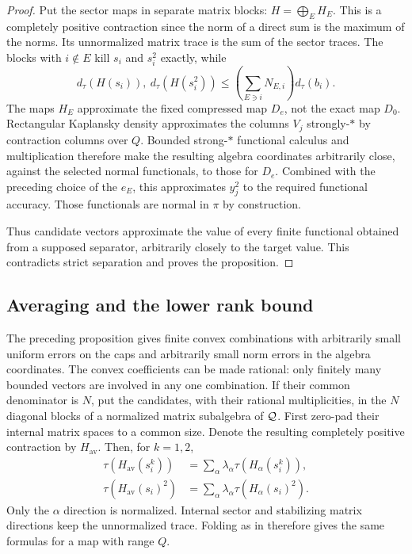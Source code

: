 \begin{proof}
Put the sector maps in separate matrix blocks:
$H=\bigoplus_E H_E$.  This is a completely positive contraction since
the norm of a direct sum is the maximum of the norms.  Its
unnormalized matrix trace is the sum of the sector traces.  The blocks
with $i\notin E$ kill $s_i$ and $s_i^2$ exactly, while
\[
 d_\tau(H(s_i)),\ d_\tau(H(s_i^2))
   \leq\left(\sum_{E\ni i}N_{E,i}\right)d_\tau(b_i).
\]
The maps $H_E$ approximate the fixed compressed map $D_e$,
not the exact map $D_0$.  Rectangular Kaplansky density approximates the
columns $V_j$ strongly-$*$ by contraction columns over $Q$.  Bounded
strong-$*$ functional calculus and multiplication therefore make the
resulting algebra coordinates arbitrarily close, against the selected
normal functionals, to those for $D_e$.  Combined with the preceding
choice of the $e_E$, this approximates $y_j^2$ to the required functional
accuracy.  Those functionals are normal in $\pi$ by construction.

Thus candidate vectors approximate the value of every finite
functional obtained from a supposed separator, arbitrarily closely
to the target value.  This contradicts strict separation and proves
the proposition.
\end{proof}

\subsection{Averaging and the lower rank bound}

The preceding proposition gives finite convex combinations with
arbitrarily small uniform errors on the caps and arbitrarily small
norm errors in the algebra coordinates.  The convex coefficients can
be made rational: only finitely many bounded vectors are involved in
any one combination.  If their common denominator is $N$, put the
candidates, with their rational multiplicities, in the $N$ diagonal
blocks of a normalized matrix subalgebra of $\mathcal Q$.  First zero-pad
their internal matrix spaces to a common size.  Denote the resulting
completely positive contraction by $H_{\mathrm{av}}$.  Then, for
$k=1,2$,
\begin{equation}\label{tc:average-traces}
 \begin{split}
 \tau(H_{\mathrm{av}}(s_i^k))
    &=\sum_\alpha\lambda_\alpha\tau(H_\alpha(s_i^k)),\\
 \tau(H_{\mathrm{av}}(s_i)^2)
    &=\sum_\alpha\lambda_\alpha\tau(H_\alpha(s_i)^2).
 \end{split}
\end{equation}
Only the $\alpha$ direction is normalized.  Internal sector and
stabilizing matrix directions keep the unnormalized trace.  Folding
as in  therefore gives the same formulas for a map
with range $Q$.

